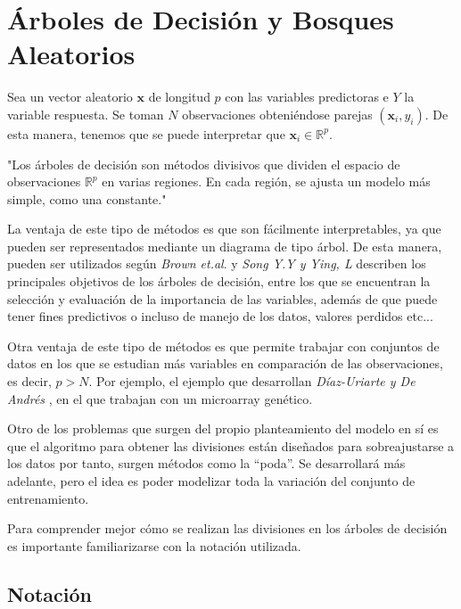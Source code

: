 \newpage
\section{ Árboles de Decisión y Bosques Aleatorios}
\noindent Sea un vector aleatorio $\textbf{x}$ de longitud $p$ con las variables predictoras e $Y$ la variable respuesta. Se toman $N$ observaciones obteniéndose parejas $(\textbf{x}_i,y_i)$. De esta manera, tenemos que se puede interpretar que $\mathbf{x}_i\in\mathbb{R}^p$.

\noindent "Los árboles de decisión son métodos divisivos que dividen el espacio de observaciones $\mathbb{R}^p$ en varias regiones. En cada región, se ajusta un modelo más simple, como una constante."

\noindent La ventaja de este tipo de métodos es que son fácilmente interpretables, ya que pueden ser representados mediante un diagrama de tipo árbol. De esta manera, pueden ser utilizados según \textit{Brown et.al}.\cite{Brown 2004} y \emph{Song Y.Y y Ying, L} \cite{Song 2015} describen los principales objetivos de los árboles de decisión, entre los que se encuentran la selección y evaluación de la importancia de las variables, además de que puede tener fines predictivos o incluso de manejo de los datos, valores perdidos etc...

\noindent Otra ventaja de este tipo de métodos es que permite trabajar con conjuntos de datos en los que se estudian más variables en comparación de las observaciones, es decir, $p > N$. Por ejemplo, el ejemplo que desarrollan \textit{Díaz-Uriarte y De Andrés} \cite{Diaz 2006}, en el que trabajan con un microarray genético. 

\noindent Otro de los problemas que surgen del propio planteamiento del modelo en sí es que el algoritmo para obtener las divisiones están diseñados para sobreajustarse a los datos por tanto, surgen métodos como la ``poda''. Se desarrollará más adelante, pero el idea es poder modelizar toda la variación del conjunto de entrenamiento. 

\noindent Para comprender mejor cómo se realizan las divisiones en los árboles de decisión es importante familiarizarse con la notación utilizada.

\subsection*{Notación}

